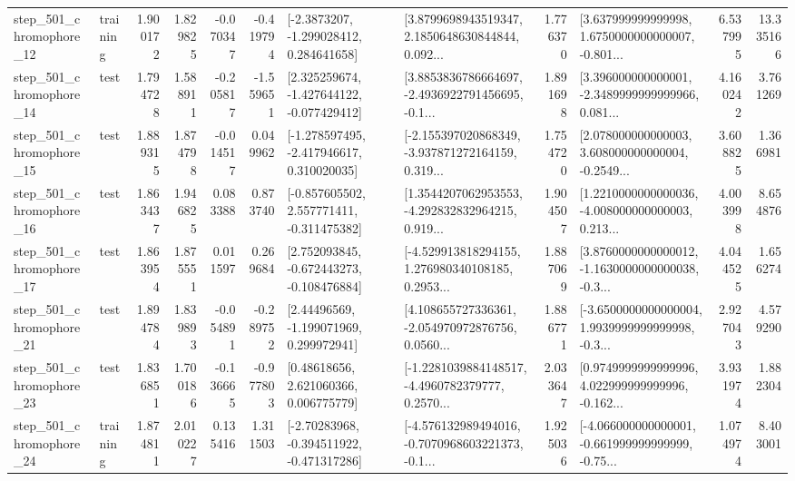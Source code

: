 \begin{tabular}{llrrrrllrlrr}
  step\_501\_chromophore\_12 &  training &      1.900172 &    1.829825 &     -0.070347 & -0.419794 &     [-2.3873207, -1.299028412, 0.284641658] &  [3.8799698943519347, 2.1850648630844844, 0.092... &       1.776370 &  [3.637999999999998, 1.6750000000000007, -0.801... &            6.537995 &         13.335166 \\
  step\_501\_chromophore\_14 &      test &      1.794728 &    1.588911 &     -0.205817 & -1.559651 &   [2.325259674, -1.427644122, -0.077429412] &  [3.8853836786664697, -2.4936922791456695, -0.1... &       1.891698 &  [3.396000000000001, -2.3489999999999966, 0.081... &            4.160242 &          3.761269 \\
  step\_501\_chromophore\_15 &      test &      1.889315 &    1.874798 &     -0.014517 &  0.049962 &   [-1.278597495, -2.417946617, 0.310020035] &  [-2.155397020868349, -3.937871272164159, 0.319... &       1.754720 &  [2.078000000000003, 3.608000000000004, -0.2549... &            3.608825 &          1.366981 \\
  step\_501\_chromophore\_16 &      test &      1.863437 &    1.946825 &      0.083388 &  0.873740 &   [-0.857605502, 2.557771411, -0.311475382] &  [1.3544207062953553, -4.292832832964215, 0.919... &       1.904507 &  [1.2210000000000036, -4.008000000000003, 0.213... &            4.003998 &          8.654876 \\
  step\_501\_chromophore\_17 &      test &      1.863954 &    1.875551 &      0.011597 &  0.269684 &   [2.752093845, -0.672443273, -0.108476884] &  [-4.529913818294155, 1.276980340108185, 0.2953... &       1.887069 &  [3.8760000000000012, -1.1630000000000038, -0.3... &            4.044525 &          1.656274 \\
  step\_501\_chromophore\_21 &      test &      1.894784 &    1.839893 &     -0.054891 & -0.289752 &     [2.44496569, -1.199071969, 0.299972941] &  [4.108655727336361, -2.054970972876756, 0.0560... &       1.886771 &  [-3.6500000000000004, 1.9939999999999998, -0.3... &            2.927043 &          4.579290 \\
  step\_501\_chromophore\_23 &      test &      1.836851 &    1.700186 &     -0.136665 & -0.977803 &      [0.48618656, 2.621060366, 0.006775779] &  [-1.2281039884148517, -4.4960782379777, 0.2570... &       2.033647 &  [0.9749999999999996, 4.022999999999996, -0.162... &            3.931974 &          1.882304 \\
  step\_501\_chromophore\_24 &  training &      1.874811 &    2.010227 &      0.135416 &  1.311503 &   [-2.70283968, -0.394511922, -0.471317286] &  [-4.576132989494016, -0.7070968603221373, -0.1... &       1.925036 &  [-4.066000000000001, -0.661999999999999, -0.75... &            1.074974 &          8.403001 \\

\end{tabular}

